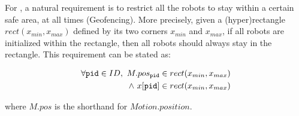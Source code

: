 For \LineForm, a natural requirement is to restrict all the robots to stay within a certain safe area, at all times (Geofencing).
More precisely, given a (hyper)rectangle $\mathit{rect}(x_{min}, x_{max})$ defined by its two corners $x_{min}$ and $x_{max}$,
if all robots are initialized within the rectangle, then all robots should always stay in the rectangle.
This requirement can be stated as:
\begin{invariant}
\label{inv:lineform}
\[
\begin{split}
    \forall \texttt{pid} \in ID,\ M.pos_{\texttt{pid}} \in rect(x_{min}, x_{max}) \\
    \land\ x[\texttt{pid}] \in rect(x_{min}, x_{max})
\end{split}
\]
\end{invariant}
\noindent
where $M.pos$ is the shorthand for $Motion.position$.



